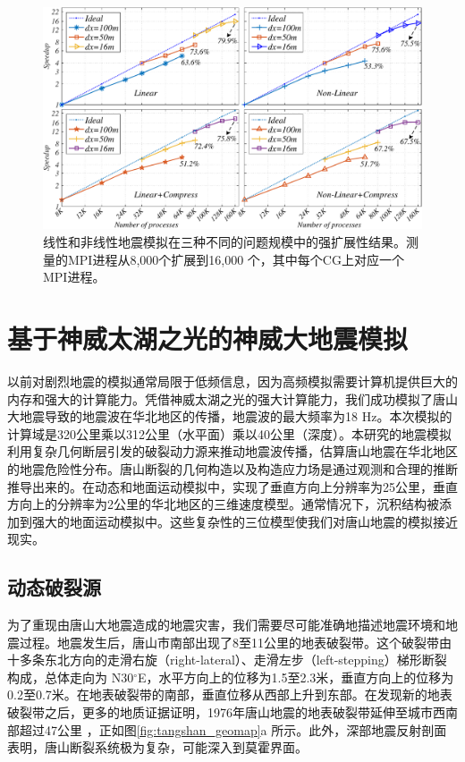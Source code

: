 \documentclass[degree=doctor]{thuthesis}
\begin{document}
\begin{figure}[h]
\centering
\includegraphics[width=1.0\columnwidth]{strong_scaling.pdf}
\caption{线性和非线性地震模拟在三种不同的问题规模中的强扩展性结果。测量的MPI进程从8,000个扩展到16,000 个，其中每个CG上对应一个MPI进程。}
\label{fig:strong-scaling}
\end{figure}

\section{基于神威太湖之光的神威大地震模拟}

以前对剧烈地震的模拟通常局限于低频信息，因为高频模拟需要计算机提供巨大的内存和强大的计算能力。凭借神威太湖之光的强大计算能力，我们成功模拟了唐山大地震导致的地震波在华北地区的传播，地震波的最大频率为18 Hz。本次模拟的计算域是320公里乘以312公里（水平面）乘以40公里（深度）。本研究的地震模拟利用复杂几何断层引发的破裂动力源来推动地震波传播，估算唐山地震在华北地区的地震危险性分布。唐山断裂的几何构造以及构造应力场是通过观测和合理的推断推导出来的。在动态和地面运动模拟中，实现了垂直方向上分辨率为25公里，垂直方向上的分辨率为2公里的华北地区的三维速度模型。通常情况下，沉积结构被添加到强大的地面运动模拟中。这些复杂性的三位模型使我们对唐山地震的模拟接近现实。

\subsection{动态破裂源}

为了重现由唐山大地震造成的地震灾害，我们需要尽可能准确地描述地震环境和地震过程。地震发生后，唐山市南部出现了8至11公里的地表破裂带。这个破裂带由十多条东北方向的走滑右旋（right-lateral）、走滑左步（left-stepping）梯形断裂构成，总体走向为 N30$^\circ$E，水平方向上的位移为1.5至2.3米，垂直方向上的位移为0.2至0.7米。在地表破裂带的南部，垂直位移从西部上升到东部。在发现新的地表破裂带\citep {Qiu_discovery_2005}之后，更多的地质证据证明，1976年唐山地震的地表破裂带延伸至城市西南部超过47公里 \citep{guo_new_2011}，正如图\ref{fig:tangshan_geomap}a 所示。此外，深部地震反射剖面表明，唐山断裂系统极为复杂，可能深入到莫霍界面\citep{liu_seismogenic_2007}。
\end{document}
